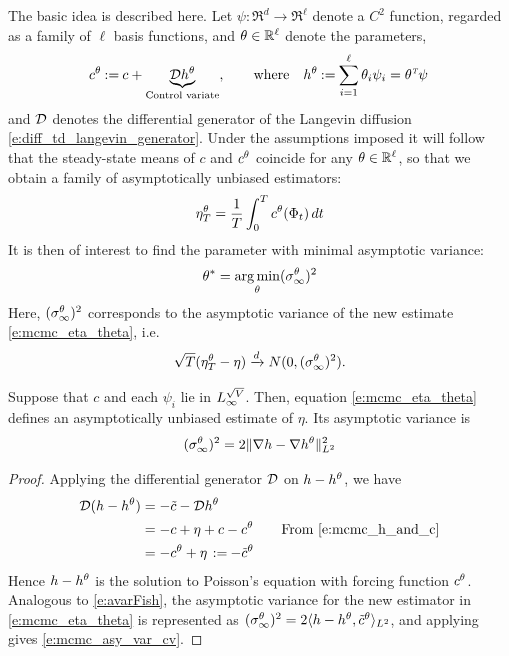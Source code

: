 The basic idea is described here. Let $\psi\colon\Re^d\to\Re^\ell$ denote a $C^2$ function, regarded as a family of $\ell$ basis functions, and $\theta\in\mathbb{R}^\ell$ denote the parameters,
\begin{equation}
\begin{aligned}
c^\param  \eqdef c + \underbrace{\generate h^\param}_{\text{Control variate}},
\qquad
\text{where}
\quad
h^\param  \eqdef  \sum_{i=1}^\ell \param_i \psi_i = \param^\transpose \psi\,
\end{aligned}
\label{e:mcmc_h_and_c}
\end{equation}
and ${\cal D}$ denotes the differential generator of the Langevin diffusion \eqref{e:diff_td_langevin_generator}. 
Under the assumptions imposed it will follow that the steady-state means of $c$ and $c^\theta$ coincide for any $\theta\in\mathbb{R}^\ell$,  so that we obtain a family of asymptotically unbiased estimators: 
\begin{equation}
\eta^\param_T =\frac{1}{T}\int_0^T c^\param(\markovstate_t)  \, dt
\label{e:mcmc_eta_theta}
\end{equation}
It is then of interest to find the parameter with minimal asymptotic variance:
\begin{equation}
\param^* = \argmin_\param (\asymvar^\param)^2
\label{e:mcmc_theta_star}
\end{equation}
Here, $(\sigma_\infty^\theta)^2$ corresponds to the asymptotic variance of the new estimate \eqref{e:mcmc_eta_theta}, i.e.
\[
\sqrt{T} (\eta^\theta_T - \eta ) \xrightarrow[]{d} N (0,(\sigma_\infty^\theta)^2).
\]

\begin{proposition}
	\label{t:mcmc_say_var_cv}
	Suppose that  $c$ and each $\psi_i$ lie in $L_\infty^{\sqrt{V}}$. Then, equation \eqref{e:mcmc_eta_theta} defines an asymptotically unbiased estimate of $\eta$. Its asymptotic variance is
	\begin{equation}
	(\asymvar^\param)^2
	= 2  \| \nabla  h - \nabla h^\param  \|^2_{L^2}
	\label{e:mcmc_asy_var_cv}
	\end{equation}
\end{proposition}

\begin{proof}
	Applying the differential generator ${\cal D}$ on $h - h^\theta$, we have
	\begin{equation}
	\begin{aligned}
	\generate ( h -h^\param) & = - \tilc - \generate h^\param\\
	& = - c + \eta + c - c^\param  \qquad \text{From \eqref{e:mcmc_h_and_c}} \\
	& = - c^\param + \eta\, \eqdef -\tilc^\param
	\end{aligned}	
	\label{e:mcmc_proof_i}
	\end{equation}
	Hence $h-h^\theta$ is the solution to Poisson's equation with forcing function $c^\theta$. Analogous to \eqref{e:avarFish}, the asymptotic variance for the new estimator in \eqref{e:mcmc_eta_theta} is represented as $(\sigma_\infty^\theta)^2 = 2 \langle h - h^\theta, \tilde c^\theta \rangle_{L^2}$, and applying  gives \eqref{e:mcmc_asy_var_cv}.
\end{proof}

